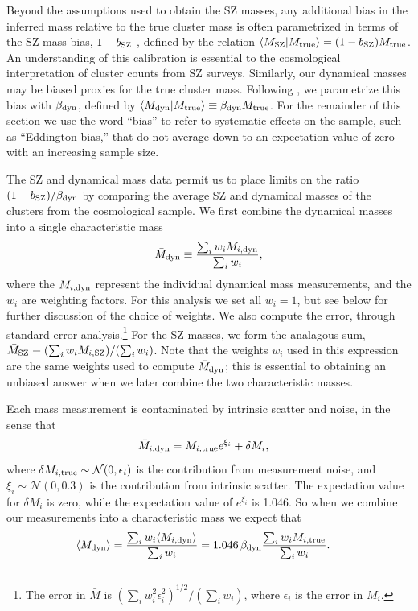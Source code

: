 Beyond the assumptions used to obtain the SZ masses, any additional bias in the inferred mass 
relative to the true cluster mass is often parametrized in terms of the SZ mass bias, $1-b_{\rm 
SZ}$ \citep[e.g.,][]{planck15xxiv}, defined by the relation $\langle M_{\rm SZ} \vert M_{\rm true} 
\rangle = (1-b_{\rm SZ})M_{\rm true}$. An understanding of this calibration is essential to the 
cosmological interpretation of cluster counts from SZ surveys. Similarly, our dynamical masses may 
be biased proxies for the true cluster mass. Following \cite{hasselfield13}, we parametrize this 
bias with $\beta_{\rm dyn}$, defined by $\langle M_{\rm dyn} \vert M_{\rm true} \rangle \equiv 
\beta_{\rm dyn} M_{\rm true}$. For the remainder of this section we use the word ``bias'' to refer 
to systematic effects on the sample, such as ``Eddington bias,'' that do not average down to an 
expectation value of zero with an increasing sample size.

The SZ and dynamical mass data permit us to place limits on the ratio $(1-b_{\rm SZ})/\beta_{\rm 
dyn}$ by comparing the average SZ and dynamical masses of the clusters from the cosmological 
sample. We first combine the dynamical masses into a single characteristic mass
\begin{align}
\bar{M}_{\rm dyn} \equiv \frac{\sum_i w_i M_{i,{\rm dyn}}}{\sum_i w_i},
\end{align}
where the $M_{i,{\rm dyn}}$ represent the individual dynamical mass measurements, and the $w_i$ 
are weighting factors. For this analysis we set all $w_i = 1$, but see below for further 
discussion of the choice of weights. We also compute the error, through standard error 
analysis.\footnote{The error in $\bar{M}$ is $(\sum_i w_i^2 \epsilon_i^2)^{1/2}/(\sum_i w_i)$, where 
$\epsilon_i$  is the error in $M_i$.} For the SZ masses, we form the analagous sum, $\bar{M}_{\rm 
SZ} \equiv (\sum_i w_i M_{i,{\rm SZ}})/(\sum_i w_i)$.  Note that the weights $w_i$ used
in this expression are the same weights used to compute $\bar{M}_{\rm dyn}$; this is essential to 
obtaining an unbiased answer when we later combine the two characteristic masses.

Each mass measurement is contaminated by intrinsic scatter and noise, in the sense that
\begin{align}
  \bar{M}_{i,{\rm dyn}} & = M_{i,{\rm true}}e^{\xi_{i}} + \delta M_{i},
\end{align}
where $\delta M_{i,{\rm true}} \sim \mathcal{N}(0,\epsilon_i)$ is the contribution from measurement 
noise, and $\xi_i \sim \mathcal{N}(0,0.3)$ is the contribution from intrinsic scatter. The 
expectation value for $\delta M_{i}$ is zero, while the expectation value of $e^{\xi_{i}}$ is 
1.046. So when we combine our measurements into a characteristic mass we expect that
\begin{align}
 \langle \bar{M}_{\rm dyn} \rangle & = \frac{\sum_i w_i \langle M_{i,{\rm dyn}} \rangle}{\sum_i 
   w_i} =  1.046\,\beta_{\rm dyn}\frac{\sum_i w_iM_{i,{\rm true}}}{\sum_i w_i}.
\end{align}

